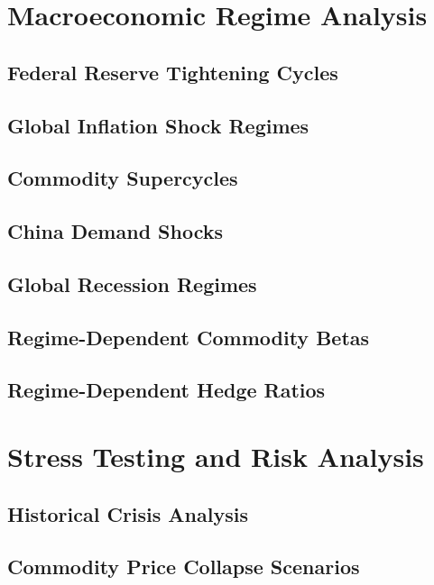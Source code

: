 \documentclass{article}
\begin{document}
\section{Macroeconomic Regime Analysis}

\subsection{Federal Reserve Tightening Cycles}

\subsection{Global Inflation Shock Regimes}

\subsection{Commodity Supercycles}

\subsection{China Demand Shocks}

\subsection{Global Recession Regimes}

\subsection{Regime-Dependent Commodity Betas}

\subsection{Regime-Dependent Hedge Ratios}

\section{Stress Testing and Risk Analysis}

\subsection{Historical Crisis Analysis}

\subsection{Commodity Price Collapse Scenarios}
\end{document}
